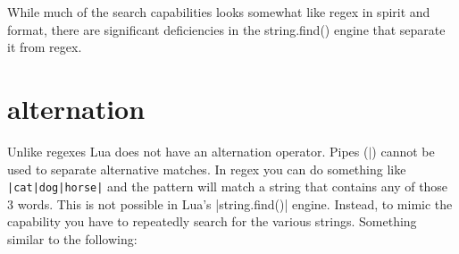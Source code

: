 While much of the search capabilities looks somewhat like regex in spirit and format, there are significant deficiencies in the string.find() engine that separate it from regex.

\section{alternation}

Unlike regexes Lua does not have an alternation operator. Pipes ($\vert$) cannot be used to separate alternative matches. In regex you can do something like \verb+|cat|dog|horse|+ and the pattern will match a string that contains any of those 3 words. This is not possible in Lua’s |string.find()| engine. Instead, to mimic the capability you have to repeatedly search for the various strings. Something similar to the following:

